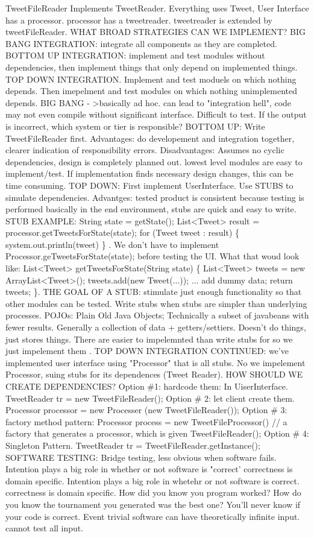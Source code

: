 \documentclass[10pt]{article}
\begin{document}
\begin{landscape}
\begin{multicols*}{6}
TweetFileReader Implements TweetReader. Everything uses Tweet, User Interface has a processor. processor has a tweetreader. tweetreader is extended by tweetFileReader. WHAT BROAD STRATEGIES CAN WE IMPLEMENT? BIG BANG INTEGRATION: integrate all components as they are completed. BOTTOM UP INTEGRATION: implement and test modules without dependencies, then implement things that only depend on implemented things. TOP DOWN INTEGRATION. Implement and test moduels on which nothing depends. Then imepelment and test modules on which nothing unimplemented depends. BIG BANG - >basically ad hoc. can lead to "integration hell", code may not even compile without significant interface. Difficult to test. If the output is incorrect, which system or tier is responsible? BOTTOM UP: Write TweetFileReader first. Advantages: do developement and integration together, clearer indication of responsibility errors. Disadvantages: Assumes no cyclic dependencies, design is completely planned out. lowest level modules are easy to implement/test. If implementation finds necessary design changes, this can be time consuming. TOP DOWN: First implement UserInterface. Use STUBS to simulate dependencies. Advantges: tested product is consistent because testing is performed basically in the end environment, stubs are quick and easy to write. STUB EXAMPLE: String state = getState(); List<Tweet> result = processor.getTweetsForState(state); for (Tweet tweet : result) \{ system.out.println(tweet) \} . We don't have to implement Processor.geTweetsForState(state); before testing the UI. What that woud look like: List<Tweet> getTweetsForState(String state) \{ List<Tweet> tweets = new ArrayList<Tweet>(); tweets.add(new Tweet(...)); ... add dummy data; return tweets; \}. THE GOAL OF A STUB: stimulate just enough functionality so that other modules can be tested. Write stubs when stubs are simpler than underlying processes. POJOs: Plain Old Java Objects; Technically a subset of javabeans with fewer results. Generally a collection of data + getters/settiers.  Doesn't do things, just stores things. There are easier to impelemnted than write stubs for so we just impelement them . TOP DOWN INTEGRATION CONTINUED: we've implemented user interface using "Processor" that is all stubs. No we impelement Processor, suing stubs for its dependences (Tweet Reader). HOW SHOULD WE CREATE DEPENDENCIES? Option \#1: hardcode them: In UiserInterface. TweetReader tr = new TweetFileReader(); Option \# 2: let client create them. Processor processor = new Processer (new TweetFileReader()); Option \# 3: factory method pattern: Processor process = new TweetFileProcessor() // a factory that generates a processor, which is given TweetFileReader(); Option \# 4: Singleton Pattern. TweetReader tr = TweetFileReader.getInstance(); SOFTWARE TESTING: Bridge testing, less obvious when software fails. Intention plays a big role in whether or not software is "correct' correctness is domain specific. Intention plays a big role in whetehr or not software is correct. correctness is domain specific. How did you know you program worked? How do you know the tournament you generated was the best one? You'll never know if your code is correct. Event trivial software can have theoretically infinite input. cannot test all input. 
\end{multicols*}
\end{landscape}
\end{document}
